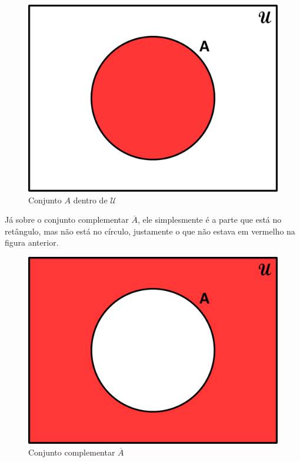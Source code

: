 \begin{figure}[h!]
  \centering
  \includegraphics[scale=0.3]{figures/sets/fig_sets_03_01.pdf}
  \caption{Conjunto $A$ dentro de $\mathcal U$}
  \label{fig:sets_03_01}
\end{figure}

Já sobre o conjunto complementar $\overline A$, ele simplesmente é a parte que está no retângulo, mas não está no círculo, justamente o que não estava em vermelho na figura anterior.

\begin{figure}[h!]
  \centering
  \includegraphics[scale=0.3]{figures/sets/fig_sets_03_02.pdf}
  \caption{Conjunto complementar $\overline A$}
  \label{fig:sets_03_02}
\end{figure}

